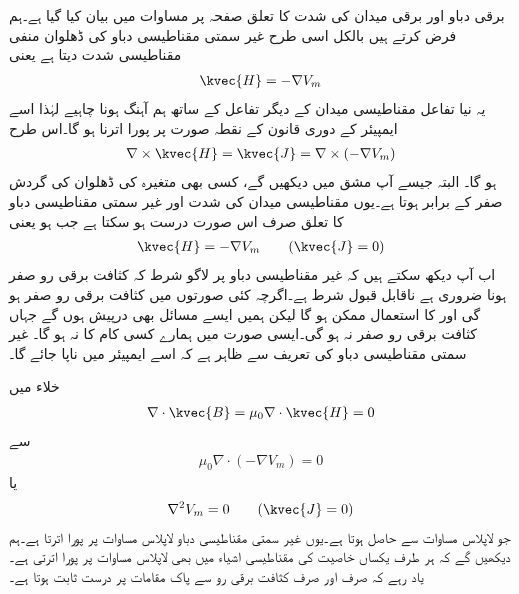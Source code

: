 برقی دباو اور برقی میدان کی شدت کا تعلق صفحہ  پر مساوات  میں بیان کیا گیا ہے۔ہم فرض کرتے ہیں  بالکل اسی طرح غیر سمتی مقناطیسی دباو  کی ڈھلوان منفی مقناطیسی شدت دیتا ہے یعنی
\begin{align*}
\kvec{H}=-\nabla V_m
\end{align*}
یہ نیا تفاعل مقناطیسی میدان کے دیگر تفاعل کے ساتھ ہم آہنگ ہونا چاہیے لہٰذا اسے ایمپیئر کے دوری قانون کے نقطہ صورت پر پورا اترنا ہو گا۔اس طرح
\begin{align}
\nabla \times \kvec{H}=\kvec{J}=\nabla \times \left(-\nabla V_m\right) 
\end{align}
ہو گا۔ البتہ جیسے آپ مشق  میں دیکھیں گے، کسی بھی متغیرہ کی ڈھلوان کی گردش صفر کے برابر ہوتا ہے۔یوں مقناطیسی میدان کی شدت اور غیر سمتی مقناطیسی دباو کا تعلق صرف اس صورت درست ہو سکتا ہے جب  ہو یعنی
\begin{align}\label{مساوات_مقناطیسی_شدت_غیر_سمتی_دباو}
\kvec{H}=-\nabla V_m \quad \quad (\kvec{J}=0)
\end{align}
اب آپ دیکھ سکتے ہیں کہ غیر مقناطیسی دباو پر لاگو شرط کہ کثافت برقی رو صفر ہونا ضروری ہے ناقابل قبول شرط ہے۔اگرچہ کئی صورتوں میں کثافت برقی رو صفر ہو گی اور  کا استعمال ممکن ہو گا لیکن ہمیں ایسے مسائل بھی درپیش ہوں  گے جہاں کثافت برقی رو صفر نہ ہو گی۔ایسی صورت میں  ہمارے کسی کام کا نہ ہو گا۔ غیر سمتی مقناطیسی دباو  کی تعریف سے ظاہر ہے کہ اسے ایمپیئر میں ناپا جائے گا۔

خلاء میں
\begin{align*}
\nabla \cdot \kvec{B}=\mu_0 \nabla \cdot \kvec{H}=0
\end{align*}
سے
\begin{align*}
\mu_0 \nabla \cdot \left(-\nabla V_m \right)=0
\end{align*}
یا
\begin{align}
\nabla^2 V_m=0 \quad \quad (\kvec{J}=0)
\end{align}
جو لاپلاس مساوات سے حاصل ہوتا ہے۔یوں غیر سمتی مقناطیسی دباو لاپلاس مساوات پر پورا اترتا ہے۔ہم دیکھیں گے کہ ہر طرف یکساں خاصیت کی مقناطیسی اشیاء میں بھی  لاپلاس مساوات پر پورا اترتی ہے۔یاد رہے کہ  صرف اور صرف کثافت برقی رو سے پاک مقامات پر درست ثابت ہوتا ہے۔


